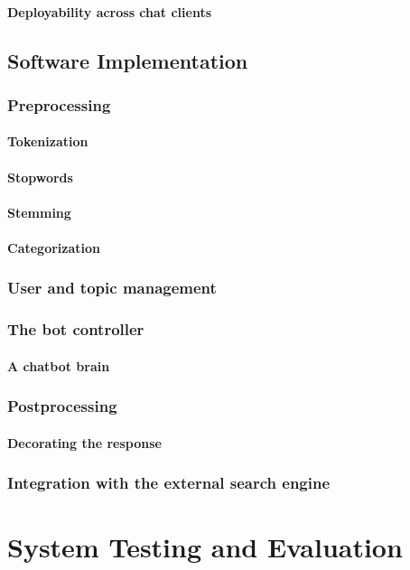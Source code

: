 \documentclass[12pt, twoside, a4paper, draft]{report}
\begin{document}
\subsubsection{Deployability across chat clients}
\section{Software Implementation}
\subsection{Preprocessing}
\subsubsection{Tokenization}
\subsubsection{Stopwords}
\subsubsection{Stemming}
\subsubsection{Categorization}
\subsection{User and topic management}
\subsection{The bot controller}
\subsubsection{A chatbot brain}
\subsection{Postprocessing}
\subsubsection{Decorating the response}
\subsection{Integration with the external search engine}

\chapter{System Testing and Evaluation}
\end{document}
